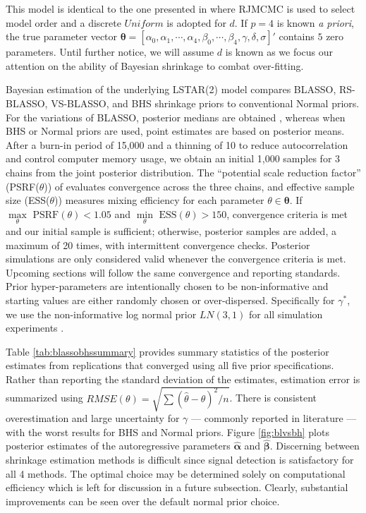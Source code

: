  This model is identical to the one presented in \cite{Lopes2006} where RJMCMC is used to select model order and a discrete $Uniform$ is adopted for $d$. If $p=4$ is known \textit{a priori}, the true parameter vector $\bm{\theta}=[\alpha_0, \alpha_1, \cdots, \alpha_4, \beta_0,\cdots,\beta_4, \gamma,\delta,\sigma]'$ contains $5$ zero parameters. Until further notice, we will assume $d$ is known as we focus our attention on the ability of Bayesian shrinkage to combat over-fitting.

Bayesian estimation of the underlying LSTAR(2) model compares  BLASSO, RS-BLASSO, VS-BLASSO, and BHS shrinkage priors to conventional Normal priors. For the variations of BLASSO, posterior medians are obtained \citep{Park2008}, whereas when BHS \citep{Carvalho2009} or Normal priors are used, point estimates are based on posterior means. After a burn-in period of 15,000 and a thinning of 10 to reduce autocorrelation and control computer memory usage, we obtain an initial 1,000 samples for 3 chains from the joint posterior distribution. The ``potential scale reduction factor'' (PSRF($\theta$)) of \cite{Gelman1992} evaluates convergence across the three chains, and effective sample size (ESS($\theta$)) measures mixing efficiency for each parameter $\theta \in \bm{\theta}$.  If $\underset{\theta}{\max} \textrm{ PSRF}(\theta)<1.05$ and $\underset{\theta}{\min} \textrm{ ESS}(\theta)>150$, convergence criteria is met and our initial sample is sufficient; otherwise, posterior samples are added, a maximum of 20 times, with intermittent convergence checks. Posterior simulations are only considered valid whenever the convergence criteria is met. Upcoming sections will follow the same convergence and reporting standards. Prior hyper-parameters are intentionally chosen to be non-informative and starting values are either randomly chosen or over-dispersed. Specifically for $\gamma^*$, we use the non-informative log normal prior $LN(3,1)$ for all  simulation experiments \citep{Gerlach2008}. 

Table  \ref{tab:blassobhssummary} provides summary statistics of the posterior estimates from replications that converged using all five prior specifications. Rather than reporting the standard deviation of the estimates, estimation error is summarized using $RMSE(\theta)=\sqrt{\sum(\hat{\theta}-\theta)^2/n}$. There is consistent overestimation and large uncertainty for $\gamma$ --- commonly reported in literature \citep{Livingston2017} --- with the worst results for BHS and Normal priors. Figure \ref{fig:blvsbh} plots posterior estimates of the autoregressive parameters $\hat{\bm{\alpha}}$ and $\hat{\bm{\beta}}$. Discerning between shrinkage estimation methods is difficult since signal detection is satisfactory for all 4 methods. The optimal choice may be determined solely on computational efficiency which is left for discussion in a future subsection. Clearly, substantial improvements can be seen over the default normal prior choice.

